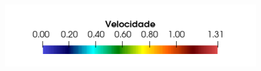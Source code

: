 \begin{figure}[!htbp]
	 \\
	{\includegraphics[trim=0 0.2cm 0 0,clip=true,scale=0.4]{Imagens/Cap6/aerofolio_velLegenda.png}}
	\label{fig:aerofolio_velocidade}
\end{figure}


